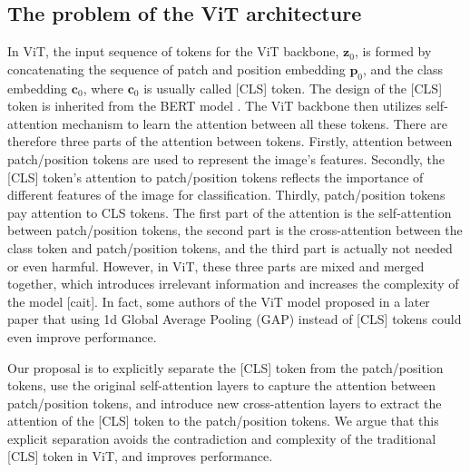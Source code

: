 \documentclass[anon,12pt]{colt2024} %
\begin{document}
\subsection{The problem of the ViT architecture}

In ViT, the input sequence of tokens for the ViT backbone, $\mathbf{z}_0$, is formed by concatenating the sequence of patch and position embedding  $\mathbf{p}_0$, and the class embedding  $\mathbf{c}_0$, where $\mathbf{c}_0$ is usually called [CLS] token.
The design of the [CLS] token is inherited from the BERT model \cite{devlin2018bert}.%
The ViT backbone then utilizes self-attention mechanism to learn the attention between all these tokens.
There are therefore three parts of the attention between tokens. Firstly, attention between patch/position tokens are used to represent the image's features. Secondly, the [CLS] token's attention to patch/position tokens reflects the importance of different features of the image for classification. Thirdly, patch/position tokens pay attention to CLS tokens.
The first part of the attention is the self-attention between patch/position tokens, the second part is the cross-attention between the class token and patch/position tokens, and the third part is actually not needed or even harmful.
However, in ViT, these three parts are mixed and merged together, which introduces irrelevant information and increases the complexity of the model [cait].
In fact, some authors of the ViT model proposed in a later paper \cite{beyer2022better} that using 1d Global Average Pooling (GAP) instead of [CLS] tokens could even improve performance.

Our proposal is to explicitly separate the [CLS] token from the patch/position tokens, use the original self-attention layers to capture the attention between patch/position tokens, and introduce new cross-attention layers to extract the attention of the [CLS] token to the patch/position tokens.
We argue that this explicit separation avoids the contradiction and complexity of the traditional [CLS] token in ViT, and improves performance.
\end{document}

